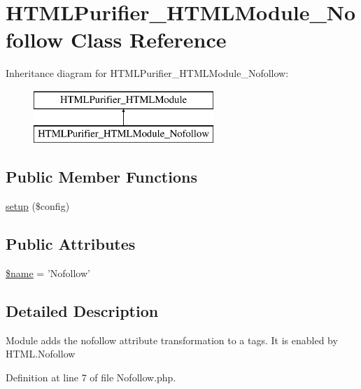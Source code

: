 \hypertarget{classHTMLPurifier__HTMLModule__Nofollow}{\section{H\+T\+M\+L\+Purifier\+\_\+\+H\+T\+M\+L\+Module\+\_\+\+Nofollow Class Reference}
\label{classHTMLPurifier__HTMLModule__Nofollow}
}
Inheritance diagram for H\+T\+M\+L\+Purifier\+\_\+\+H\+T\+M\+L\+Module\+\_\+\+Nofollow\+:\begin{figure}[H]
\begin{center}
\leavevmode
\includegraphics[height=2.000000cm]{classHTMLPurifier__HTMLModule__Nofollow}
\end{center}
\end{figure}
\subsection*{Public Member Functions}
\begin{DoxyCompactItemize}
\item 
\hyperlink{classHTMLPurifier__HTMLModule__Nofollow_ae9775a1038ad12134f35052a619c96c6}{setup} (\$config)
\end{DoxyCompactItemize}
\subsection*{Public Attributes}
\begin{DoxyCompactItemize}
\item 
\hyperlink{classHTMLPurifier__HTMLModule__Nofollow_a56487ab72c9ce41fb98a6968bd3798b5}{\$name} = 'Nofollow'
\end{DoxyCompactItemize}


\subsection{Detailed Description}
Module adds the nofollow attribute transformation to a tags. It is enabled by H\+T\+M\+L.\+Nofollow 

Definition at line 7 of file Nofollow.\+php.



